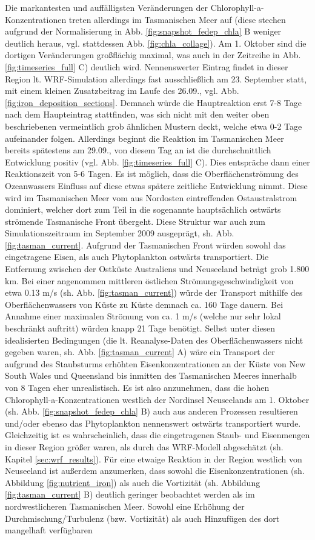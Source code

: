 \documentclass[12pt,a4paper,onecolumn,headheight=30pt]{scrartcl}
\begin{document}
Die markantesten und auffälligsten Veränderungen der Chlorophyll-a-Konzentrationen treten allerdings im Tasmanischen Meer auf (diese stechen aufgrund der Normalisierung in Abb. \ref{fig:snapshot_fedep_chla} B weniger deutlich heraus, vgl. stattdessen Abb. \ref{fig:chla_collage}). Am 1. Oktober sind die dortigen Veränderungen großflächig maximal, was auch in der Zeitreihe in Abb. \ref{fig:timeseries_full} C) deutlich wird. Nennenswerter Eintrag findet in dieser Region lt. WRF-Simulation allerdings fast ausschließlich am 23. September statt, mit einem kleinen Zusatzbeitrag im Laufe des 26.09., vgl. Abb. \ref{fig:iron_deposition_sections}. Demnach würde die Hauptreaktion erst 7-8 Tage nach dem Haupteintrag stattfinden, was sich nicht mit den weiter oben beschriebenen vermeintlich grob ähnlichen Mustern deckt, welche etwa 0-2 Tage aufeinander folgen. Allerdings beginnt die Reaktion im Tasmanischen Meer bereits spätestens am 29.09., von diesem Tag an ist die durchschnittlich Entwicklung positiv (vgl. Abb. \ref{fig:timeseries_full} C). Dies entspräche dann einer Reaktionszeit von 5-6 Tagen. Es ist möglich, dass die Oberflächenströmung des Ozeanwassers Einfluss auf diese etwas spätere zeitliche Entwicklung nimmt. Diese wird im Tasmanischen Meer vom aus Nordosten eintreffenden Ostaustralstrom dominiert, welcher dort zum Teil in die sogenannte hauptsächlich ostwärts strömende Tasmanische Front übergeht. Diese Struktur war auch zum Simulationszeitraum im September 2009 ausgeprägt, sh. Abb. \ref{fig:tasman_current}. Aufgrund der Tasmanischen Front würden sowohl das eingetragene Eisen, als auch Phytoplankton ostwärts transportiert. Die Entfernung zwischen der Ostküste Australiens und Neuseeland beträgt grob 1.800 km. Bei einer angenommen mittleren östlichen Strömungsgeschwindigkeit von etwa 0.13 m/s (sh. Abb. \ref{fig:tasman_current}) würde der Transport mithilfe des Oberflächenwassers von Küste zu Küste demnach ca. 160 Tage dauern. Bei Annahme einer maximalen Strömung von ca. 1 m/s (welche nur sehr lokal beschränkt auftritt) würden knapp 21 Tage benötigt. Selbst unter diesen idealisierten Bedingungen (die lt. Reanalyse-Daten des Oberflächenwassers nicht gegeben waren, sh. Abb. \ref{fig:tasman_current} A) wäre ein Transport der aufgrund des Staubsturms erhöhten Eisenkonzentrationen an der Küste von New South Wales und Queensland bis inmitten des Tasmanischen Meeres innerhalb von 8 Tagen eher unrealistisch. Es ist also anzunehmen, dass die hohen Chlorophyll-a-Konzentrationen westlich der Nordinsel Neuseelands am 1. Oktober (sh. Abb. \ref{fig:snapshot_fedep_chla} B) auch aus anderen Prozessen resultieren und/oder ebenso das Phytoplankton nennenswert ostwärts transportiert wurde. Gleichzeitig ist es wahrscheinlich, dass die eingetragenen Staub- und Eisenmengen in dieser Region größer waren, als durch das WRF-Modell abgeschätzt (sh. Kapitel \ref{sec:wrf_results}). Für eine etwaige Reaktion in der Region westlich von Neuseeland ist außerdem anzumerken, dass sowohl die Eisenkonzentrationen (sh. Abbildung \ref{fig:nutrient_iron}) als auch die Vortizität (sh. Abbildung \ref{fig:tasman_current} B) deutlich geringer beobachtet werden als im nordwestlicheren Tasmanischen Meer. Sowohl eine Erhöhung der Durchmischung/Turbulenz (bzw. Vortizität) als auch Hinzufügen des dort mangelhaft verfügbaren 
\end{document}
